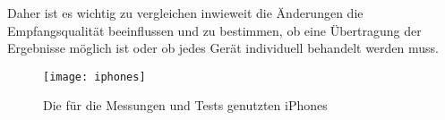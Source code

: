 Daher ist es wichtig zu vergleichen inwieweit die Änderungen die Empfangsqualität beeinflussen und zu bestimmen, ob eine Übertragung der Ergebnisse möglich ist oder ob jedes Gerät individuell behandelt werden muss.

\begin{figure}[htb!]
		\centering
	\texttt{[image: iphones]}
	\caption{Die für die Messungen und Tests genutzten iPhones}
	\label{iphones}
\end{figure}



